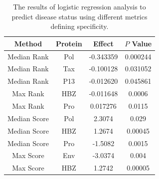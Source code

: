 \begin{table}[htp]
\begin{center}
\begin{tabulary}{1.5\textwidth}{|c|c|c|c|}
\hline
Method & Protein & Effect & $P$ Value \bigstrut \\
\hline
Median Rank & Pol & -0.343359 & 0.000244 \bigstrut[t] \\
Median Rank & Tax & -0.100128 & 0.031052 \\ 
Median Rank & P13 & -0.012620 & 0.045861 \bigstrut[b] \\
\hline
Max Rank & HBZ & -0.011648 & 0.0006 \bigstrut[t] \\
Max Rank & Pro & 0.017276 & 0.0115 \bigstrut[b] \\
\hline
Median Score & Pol & 2.3074 & 0.029 \bigstrut[t] \\
Median Score & HBZ & 1.2674 & 0.00045 \\
Median Score & Pro & -1.5082 & 0.0015 \bigstrut[b] \\
\hline
Max Score & Env & -3.0374 & 0.004 \bigstrut[t] \\
Max Score & HBZ & 1.2742 & 0.00005 \bigstrut[b] \\
\hline
\end{tabulary}
\end{center}

\caption[Logistic regression analysis using strength of peptide binding]{The results of logistic regression analysis to predict disease status using different metrics defining specificity.}\label{appendixc/tableLogRegress}
\end{table}

